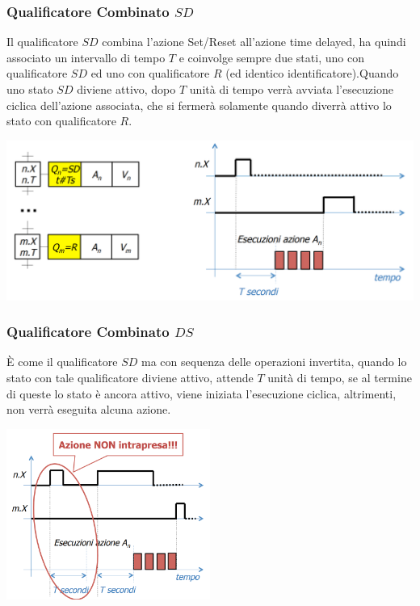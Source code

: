 \documentclass[10pt, letterpaper]{report}
\begin{document}
\subsubsection{Qualificatore Combinato $SD$}
Il qualificatore $SD$ combina l'azione Set/Reset all'azione time delayed, ha quindi associato un intervallo di tempo $T$ e coinvolge sempre due stati, uno con qualificatore $SD$ ed uno con qualificatore $R$ (ed identico identificatore).\acc Quando uno stato $SD$ diviene attivo, dopo $T$ unità di tempo verrà avviata l'esecuzione ciclica dell'azione associata, che si fermerà solamente quando diverrà attivo lo stato con qualificatore $R$.
\begin{center}
    \includegraphics[width=1\textwidth ]{images/SDQual.png}
\end{center}
\subsubsection{Qualificatore Combinato $DS$}
È come il qualificatore $SD$ ma con sequenza delle operazioni invertita, quando lo stato con tale qualificatore diviene attivo, attende $T$ unità di tempo, se al termine di queste lo stato è ancora attivo, viene iniziata l'esecuzione ciclica, altrimenti, non verrà eseguita alcuna azione.
\begin{center}
    \includegraphics[width=0.5\textwidth ]{images/DSQual.png}
\end{center}
\end{document}
